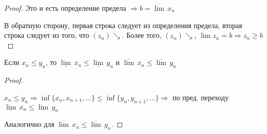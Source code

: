 \begin{proof}
        Это и есть определение предела $\Rightarrow b = 
        \overline{\lim}\, x_n$
    
        В обратную сторону, первая строка следует из определения предела,
        вторая строка следует из того, что $(z_n) \searrow$. Более того,
        $(z_n) \searrow$, $\lim z_n = b \Rightarrow z_n \geqslant b$
    
    \end{proof}
    
    \begin{theorem-non}\end{theorem-non}
    Если $x_n \leqslant y_n$, то 
    $\underline{\lim}\, x_n \leqslant \underline{\lim}\, y_n$ и  
    $\overline{\lim}\, x_n \leqslant \overline{\lim}\, y_n$
    
    \begin{proof} $ $
    
    $x_n \leqslant y_n \Rightarrow \inf\{x_n, x_{n + 1}, ...\} \leq
    \inf\{y_n, y_{n + 1}, ...\} \Rightarrow$ по пред. переходу 
    $\underline{\lim}\, x_n \leqslant \underline{\lim}\, y_n$
    
    Аналогично для $\overline{\lim}\, x_n \leqslant \overline{\lim}\, y_n$.
    \end{proof}